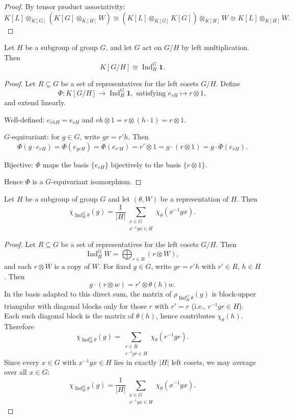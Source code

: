 \begin{proof}
By tensor product associativity:
\[
K[L] \otimes_{K[G]} (K[G] \otimes_{K[H]} W) \cong (K[L] \otimes_{K[G]} K[G] )\otimes_{K[H]} W \cong K[L] \otimes_{K[H]} W.
\]
\end{proof}

\begin{prop}
Let \(H\) be a subgroup of group $G$, and let \(G\) act on \(G/H\) by left multiplication. Then 
\[
K[G/H] \cong \operatorname{Ind}_H^G \mathbf{1}.
\]
\end{prop}

\begin{proof}
Let \( R \subseteq G \) be a set of representatives for the left cosets \( G/H \). Define
\[
\Phi: K[G/H] \to \operatorname{Ind}_H^G \mathbf{1}, \text{ satisfying } e_{rH} \mapsto r \otimes 1,
\]
and extend linearly.

\medskip
\noindent
Well-defined: \( e_{rhH} = e_{rH} \) and \( rh \otimes 1 = r \otimes (h \cdot 1) = r \otimes 1 \).

\medskip
\noindent
\( G \)-equivariant: for \( g \in G \), write \( gr = r' h \). Then
\[
\Phi(g \cdot e_{rH}) = \Phi(e_{grH}) = \Phi(e_{r'H}) = r' \otimes 1 = g \cdot (r \otimes 1) = g \cdot \Phi(e_{rH}).
\]

\medskip
\noindent
Bijective: \( \Phi \) maps the basis \( \{e_{rH}\} \) bijectively to the basis \( \{r \otimes 1\} \).

Hence \( \Phi \) is a \( G \)-equivariant isomorphism.
\end{proof}
\begin{prop}
\label{Character Formula for Induced Representations}
Let \(H\) be a subgroup of group $G$ and let \((\theta, W)\) be a representation of \(H\). Then 
\[
\chi_{\operatorname{Ind}_H^G \theta}(g) = \frac{1}{|H|} \sum_{\substack{x \in G \\ x^{-1}gx \in H}} \chi_\theta(x^{-1}gx).
\]
\end{prop}
\begin{proof}
Let \(R \subseteq G\) be a set of representatives for the left cosets \(G/H\). Then
\[
\operatorname{Ind}_H^G W = \bigoplus_{r \in R} (r \otimes W
),
\]
and each \(r \otimes W\) is a copy of \(W\). For fixed \(g \in G\), write \(gr = r' h\) with \(r' \in R\), \(h \in H\). Then
\[
g \cdot (r \otimes w) = r' \otimes \theta(h) w.
\]
In the basis adapted to this direct sum, the matrix of \(\rho_{\operatorname{Ind}_H^G \theta}(g)\) is block-upper triangular with diagonal blocks only for those \(r\) with \(r' = r\) (i.e., \(r^{-1}gr \in H\)). Each such diagonal block is the matrix of \(\theta(h)\), hence contributes \(\chi_\theta(h)\). Therefore
\[
\chi_{\operatorname{Ind}_H^G \theta}(g) = \sum_{\substack{r \in R \\ r^{-1}gr \in H}} \chi_\theta(r^{-1}gr).
\]
Since every \(x \in G\) with \(x^{-1}gx \in H\) lies in exactly \(|H|\) left cosets, we may average over all \(x \in G\):
\[
\chi_{\operatorname{Ind}_H^G \theta}(g) = \frac{1}{|H|} \sum_{\substack{x \in G \\ x^{-1}gx \in H}} \chi_\theta(x^{-1}gx).
\]
\end{proof}
